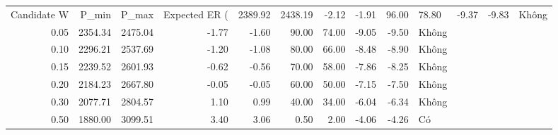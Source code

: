 \begin{tabular}{rrrrrrrrrl}
\toprule
Candidate W & P_min & P_max & Expected ER (%
 & 2389.92 & 2438.19 & -2.12 & -1.91 & 96.00 & 78.80 & -9.37 & -9.83 & Không \\
0.05 & 2354.34 & 2475.04 & -1.77 & -1.60 & 90.00 & 74.00 & -9.05 & -9.50 & Không \\
0.10 & 2296.21 & 2537.69 & -1.20 & -1.08 & 80.00 & 66.00 & -8.48 & -8.90 & Không \\
0.15 & 2239.52 & 2601.93 & -0.62 & -0.56 & 70.00 & 58.00 & -7.86 & -8.25 & Không \\
0.20 & 2184.23 & 2667.80 & -0.05 & -0.05 & 60.00 & 50.00 & -7.15 & -7.50 & Không \\
0.30 & 2077.71 & 2804.57 & 1.10 & 0.99 & 40.00 & 34.00 & -6.04 & -6.34 & Không \\
0.50 & 1880.00 & 3099.51 & 3.40 & 3.06 & 0.50 & 2.00 & -4.06 & -4.26 & Có \\
\bottomrule
\end{tabular}
